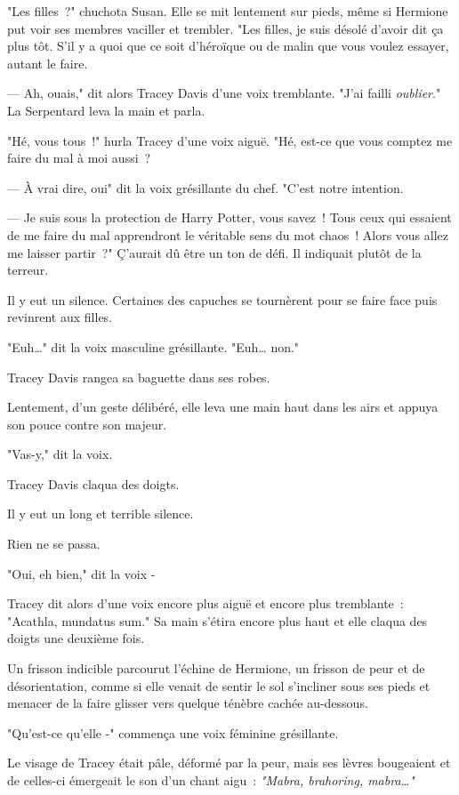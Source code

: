 "Les filles~?" chuchota Susan. Elle se mit lentement sur pieds, même si Hermione put voir ses membres vaciller et trembler. "Les filles, je suis désolé d'avoir dit ça plus tôt. S'il y a quoi que ce soit d'héroïque ou de malin que vous voulez essayer, autant le faire.

--- Ah, ouais," dit alors Tracey Davis d'une voix tremblante. "J'ai failli \emph{oublier}." La Serpentard leva la main et parla.

"Hé, vous tous~!" hurla Tracey d'une voix aiguë. "Hé, est-ce que vous comptez me faire du mal à moi aussi~?

--- À vrai dire, oui" dit la voix grésillante du chef. "C'est notre intention.

--- Je suis sous la protection de Harry Potter, vous savez~! Tous ceux qui essaient de me faire du mal apprendront le véritable sens du mot chaos~! Alors vous allez me laisser partir~?" Ç'aurait dû être un ton de défi. Il indiquait plutôt de la terreur.

Il y eut un silence. Certaines des capuches se tournèrent pour se faire face puis revinrent aux filles.

"Euh…" dit la voix masculine grésillante. "Euh… non."

Tracey Davis rangea sa baguette dans ses robes.

Lentement, d'un geste délibéré, elle leva une main haut dans les airs et appuya son pouce contre son majeur.

"Vas-y," dit la voix.

Tracey Davis claqua des doigts.

Il y eut un long et terrible silence.

Rien ne se passa.

"Oui, eh bien," dit la voix -

Tracey dit alors d'une voix encore plus aiguë et encore plus tremblante~: "Acathla, mundatus sum." Sa main s'étira encore plus haut et elle claqua des doigts une deuxième fois.

Un frisson indicible parcourut l'échine de Hermione, un frisson de peur et de désorientation, comme si elle venait de sentir le sol s'incliner sous ses pieds et menacer de la faire glisser vers quelque ténèbre cachée au-dessous.

"Qu'est-ce qu'elle -" commença une voix féminine grésillante.

Le visage de Tracey était pâle, déformé par la peur, mais ses lèvres bougeaient et de celles-ci émergeait le son d'un chant aigu~: \emph{"Mabra, brahoring, mabra…"}

